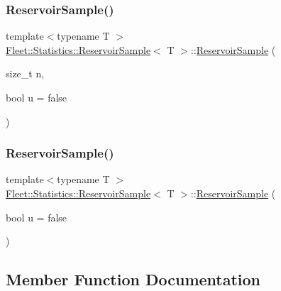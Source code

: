 \subsubsection{\texorpdfstring{Reservoir\+Sample()}{ReservoirSample()}\hspace{0.1cm}{\footnotesize\ttfamily [1/2]}}
{\footnotesize\ttfamily template$<$typename T $>$ \\
\hyperlink{class_fleet_1_1_statistics_1_1_reservoir_sample}{Fleet\+::\+Statistics\+::\+Reservoir\+Sample}$<$ T $>$\+::\hyperlink{class_fleet_1_1_statistics_1_1_reservoir_sample}{Reservoir\+Sample} (\begin{DoxyParamCaption}\item[{size\+\_\+t}]{n,  }\item[{bool}]{u = {\ttfamily false} }\end{DoxyParamCaption})\hspace{0.3cm}{\ttfamily [inline]}}

\mbox{\label{class_fleet_1_1_statistics_1_1_reservoir_sample_a39c8b405654eaca4c943263a485bc015}} 
\subsubsection{\texorpdfstring{Reservoir\+Sample()}{ReservoirSample()}\hspace{0.1cm}{\footnotesize\ttfamily [2/2]}}
{\footnotesize\ttfamily template$<$typename T $>$ \\
\hyperlink{class_fleet_1_1_statistics_1_1_reservoir_sample}{Fleet\+::\+Statistics\+::\+Reservoir\+Sample}$<$ T $>$\+::\hyperlink{class_fleet_1_1_statistics_1_1_reservoir_sample}{Reservoir\+Sample} (\begin{DoxyParamCaption}\item[{bool}]{u = {\ttfamily false} }\end{DoxyParamCaption})\hspace{0.3cm}{\ttfamily [inline]}}



\subsection{Member Function Documentation}
\mbox{\label{class_fleet_1_1_statistics_1_1_reservoir_sample_a374930296f502c957a925a5f7ba9087b}} 
